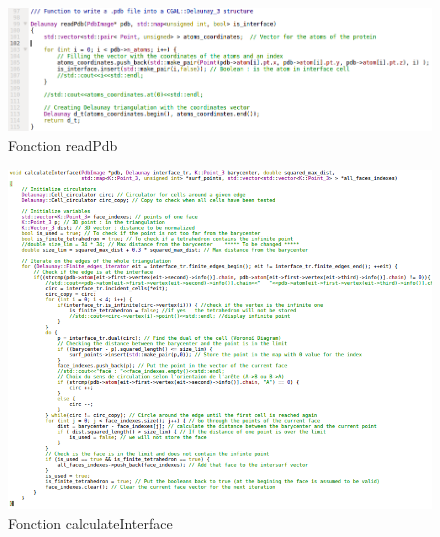 \begin{figure}[ht]
\centering
  \includegraphics[width=\textwidth]{figures/readPdb.png}
  \caption{Fonction readPdb}
  \label{fig::read_pdb}
\end{figure}

\begin{figure}[ht]
\centering
  \includegraphics[width=\textwidth]{figures/calculate_interface.png}
  \caption{Fonction calculateInterface}
  \label{fig::calculate_interface}
\end{figure}
